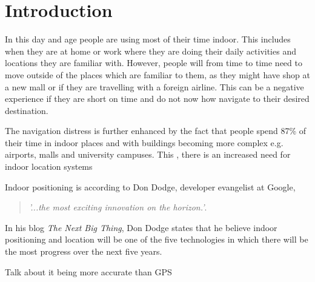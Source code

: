 \chapter{Introduction}
In this day and age people are using most of their time indoor. This includes when they are at home or work where they are doing their daily activities and locations they are familiar with. However, people will from time to time need to move outside of the places which are familiar to them, as they might have shop at a new mall or if they are travelling with a foreign airline. This can be a negative experience if they are short on time and do not now how navigate to their desired destination. 

The navigation distress is further enhanced by the fact that people spend 87\% of their time in indoor places and with buildings becoming more complex e.g. airports, malls and university campuses. This 
, there is an increased need for indoor location systems

Indoor positioning is according to Don Dodge, developer evangelist at Google, 
\begin{quotation}
	\textit{'...the most exciting innovation on the horizon.'}\cite{DonDNextBigThing}.
\end{quotation}

In his blog \textit{The Next Big Thing}, Don Dodge states that he believe indoor positioning and location will be one of the five technologies in which there will be the most progress over the next five years\cite{DonDIndoorIsNext}.

Talk about it being more accurate than GPS
